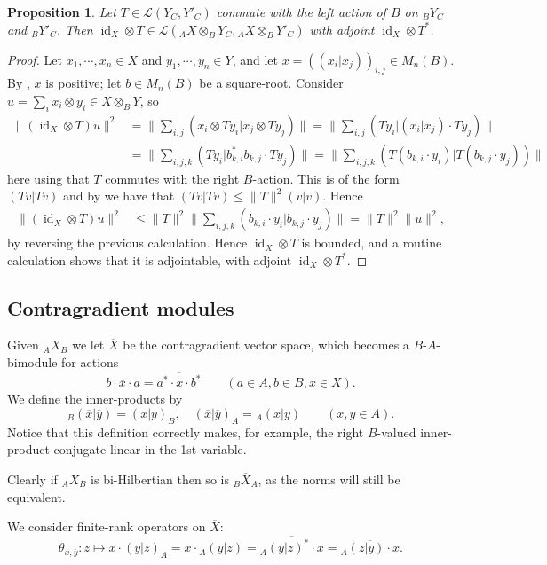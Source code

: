 \documentclass[a4paper,11pt]{article}
\theoremstyle{plain}
\newtheorem{proposition}{Proposition}[section]
\theoremstyle{remark}
\newcommand{\mc}[1]{\mathcal{#1}}
\newcommand{\id}{\operatorname{id}}
\begin{document}
\begin{proposition}\label{prop:action_other_side}
Let $T\in\mc L(Y_C, Y'_C)$ commute with the left action of $B$ on ${}_BY_C$ and ${}_BY'_C$.  Then $\id_X\otimes T \in \mc L({}_AX \otimes_B Y_C, {}_AX \otimes_B Y'_C)$ with adjoint $\id_X\otimes T^*$.
\end{proposition}
\begin{proof}
Let $x_1,\cdots,x_n \in X$ and $y_1,\cdots,y_n \in Y$, and let $x = ((x_i|x_j))_{i,j} \in M_n(B)$.  By \cite[Lemma~4.2]{Lance_HilbModsBook}, $x$ is positive; let $b \in M_n(B)$ be a square-root.  Consider $u = \sum_i x_i\otimes y_i \in X\otimes_B Y$, so
\begin{align*}
\big\| (\id_X\otimes T)u \big\|^2
&= \Big\| \sum_{i,j} (x_i\otimes Ty_i|x_j\otimes Ty_j) \Big\| 
= \Big\| \sum_{i,j} (Ty_i|(x_i|x_j) \cdot Ty_j) \Big\|  \\
&= \Big\| \sum_{i,j,k} (Ty_i | b^*_{k,i} b_{k,j} \cdot Ty_j )  \Big\|
= \Big\| \sum_{i,j,k} (T( b_{k,i}\cdot y_i) | T( b_{k,j} \cdot y_j) )  \Big\|
\end{align*}
here using that $T$ commutes with the right $B$-action.  This is of the form $(Tv|Tv)$ and by \cite[Proposition~1.2]{Lance_HilbModsBook} we have that $(Tv|Tv) \leq \|T\|^2 (v|v)$.  Hence
\begin{align*}
\big\| (\id_X\otimes T)u \big\|^2
&\leq \|T\|^2 \Big\| \sum_{i,j,k} (b_{k,i}\cdot y_i | b_{k,j} \cdot y_j )  \Big\|
= \|T\|^2 \|u\|^2,
\end{align*}
by reversing the previous calculation.  Hence $\id_X\otimes T$ is bounded, and a routine calculation shows that it is adjointable, with adjoint $\id_X\otimes T^*$.
\end{proof}
  

\subsection{Contragradient modules}\label{sec:contragradient}

Given ${}_AX_B$ we let $\overline X$ be the contragradient vector space, which becomes a $B$-$A$-bimodule for actions
\[ b \cdot \overline{x} \cdot a = \overline{ a^*\cdot x\cdot b^* }
\qquad (a\in A, b\in B, x\in X). \]
We define the inner-products by
\[ {}_B(\overline x|\overline y) = (x|y)_B, \quad
(\overline x|\overline y)_A = {}_A(x|y) \qquad (x,y\in A). \]
Notice that this definition correctly makes, for example, the right $B$-valued inner-product conjugate linear in the 1st variable.

Clearly if ${}_AX_B$ is bi-Hilbertian then so is ${}_B\overline X_A$, as the norms will still be equivalent.

We consider finite-rank operators on $\overline X$:
\begin{equation} \label{eq:finite_rank_contra}
\theta_{\overline x,\overline y} \colon \overline  z \mapsto \overline x \cdot (\overline y|\overline z)_A = \overline x \cdot {}_A(y|z) = \overline{ {}_A(y|z)^* \cdot x }
= \overline{ {}_A(z|y)\cdot x }.
\end{equation}



\end{document}

